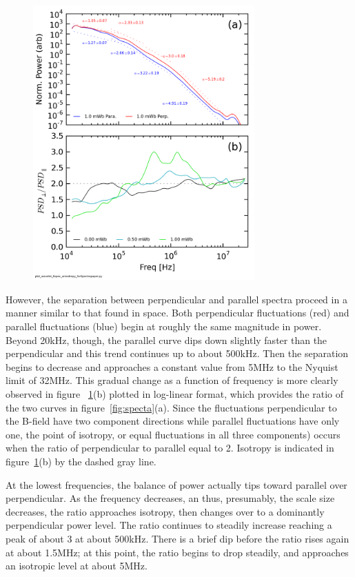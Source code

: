 \documentclass[aip,prl,amsmath,amssymb,reprint,superscriptaddress]{revtex4-1} %
\begin{document}
\begin{figure}[!htbp]
\centerline{
\includegraphics[width=8.5cm]{Bperppara_chan1t4_1mWbspectra_40t60us_wAsymRatio}}
\caption{\label{fig:spectra}}
\end{figure}

However, the separation between perpendicular and parallel spectra proceed in a manner similar to that found in space. Both perpendicular fluctuations (red) and parallel fluctuations (blue) begin at roughly the same magnitude in power. Beyond 20kHz, though, the parallel curve dips down slightly faster than the perpendicular and this trend continues up to about 500kHz. Then the separation begins to decrease and approaches a constant value from 5MHz to the Nyquist limit of 32MHz. This gradual change as a function of frequency is more clearly observed in figure ~\ref{fig:spectra}(b) plotted in log-linear format, which provides the ratio of the two curves in figure~\ref{fig:specta}(a). Since the fluctuations perpendicular to the B-field have two component directions while parallel fluctuations have only one, the point of isotropy, or equal fluctuations in all three components) occurs when the ratio of perpendicular to parallel equal to 2. Isotropy is indicated in figure~\ref{fig:spectra}(b) by the dashed gray line.

At the lowest frequencies, the balance of power actually tips toward parallel over perpendicular. As the frequency decreases, an thus, presumably, the scale size decreases, the ratio approaches isotropy, then changes over to a dominantly perpendicular power level. The ratio continues to steadily increase reaching a peak of about 3 at about 500kHz. There is a brief dip before the ratio rises again at about 1.5MHz; at this point, the ratio begins to drop steadily, and approaches an isotropic level at about 5MHz. 
\end{document}
